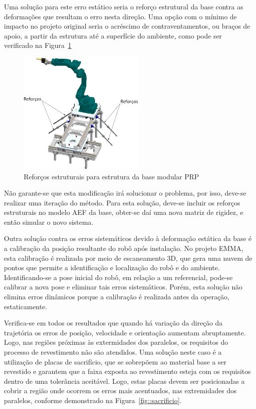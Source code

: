 Uma solução para este erro estático seria o reforço estrutural da base contra as
deformações que resultam o erro nesta direção. Uma opção com o mínimo de impacto
no projeto original seria o acréscimo de contraventamentos, ou braços de apoio,
a partir da estrutura até a superfície do ambiente, como pode ser verificado na
Figura~\ref{fig::contraventamentos}

\begin{figure}[h!]
	\centering 
 	\includegraphics[width=0.55\textwidth]{figs/contraventamentos}
 	\caption{Reforços estruturais para estrutura da base modular PRP}
 	\label{fig::contraventamentos}
\end{figure}

Não garante-se que esta modificação irá solucionar o problema, por isso, deve-se
realizar uma iteração do método. Para esta solução, deve-se incluir os reforços
estruturais no modelo AEF da base, obter-se daí uma nova matriz de rigidez, e
então simular o novo sistema.

Outra solução contra os erros sistemáticos devido à deformação estática da base
é a calibração da posição resultante do robô após instalação. No projeto EMMA,
esta calibração é realizada por meio de escaneamento 3D, que gera uma nuvem de
pontos que permite a identificação e localização do robô e do ambiente.
Identificando-se a pose inicial do robô, em relação a um referencial, pode-se
calibrar a nova pose e eliminar tais erros sistemáticos. Porém, esta solução não
elimina erros dinâmicos porque a calibração é realizada antes da operação,
estaticamente.

Verifica-se em todos os resultados que quando há variação da direção da
trajetória os erros de posição, velocidade e orientação aumentam abruptamente.
Logo, nas regiões próximas às extermidades dos paralelos, os requisitos do
processo de revestimento não são atendidos. Uma solução neste caso é a
utilização de placas de sacrifício, que se sobrepõem ao material base a ser
revestido e garantem que a faixa exposta ao revestimento esteja com os
requisitos dentro de uma tolerância aceitável. Logo, estas placas devem ser
posicionadas a cobrir a região onde ocorrem os erros mais acentuados, nas
extremidades dos paralelos, conforme demonstrado na
Figura~\ref{fig::sacrificio}.

